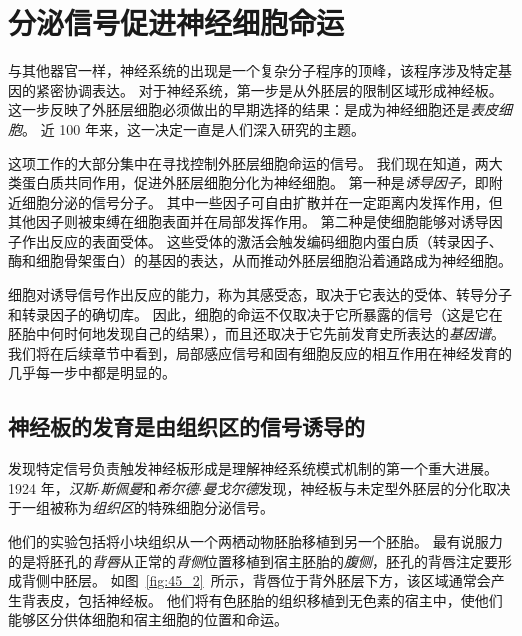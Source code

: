 \section{分泌信号促进神经细胞命运}

与其他器官一样，神经系统的出现是一个复杂分子程序的顶峰，该程序涉及特定基因的紧密协调表达。
对于神经系统，第一步是从外胚层的限制区域形成神经板。
这一步反映了外胚层细胞必须做出的早期选择的结果：是成为神经细胞还是\textit{表皮细胞}。
近 100 年来，这一决定一直是人们深入研究的主题。


这项工作的大部分集中在寻找控制外胚层细胞命运的信号。
我们现在知道，两大类蛋白质共同作用，促进外胚层细胞分化为神经细胞。
第一种是\textit{诱导因子}，即附近细胞分泌的信号分子。
其中一些因子可自由扩散并在一定距离内发挥作用，但其他因子则被束缚在细胞表面并在局部发挥作用。
第二种是使细胞能够对诱导因子作出反应的表面受体。
这些受体的激活会触发编码细胞内蛋白质（转录因子、酶和细胞骨架蛋白）的基因的表达，从而推动外胚层细胞沿着通路成为神经细胞。


细胞对诱导信号作出反应的能力，称为其感受态，取决于它表达的受体、转导分子和转录因子的确切库。
因此，细胞的命运不仅取决于它所暴露的信号（这是它在胚胎中何时何地发现自己的结果），而且还取决于它先前发育史所表达的\textit{基因谱}。
我们将在后续章节中看到，局部感应信号和固有细胞反应的相互作用在神经发育的几乎每一步中都是明显的。



\subsection{神经板的发育是由组织区的信号诱导的}

发现特定信号负责触发神经板形成是理解神经系统模式机制的第一个重大进展。
1924 年，\textit{汉斯$\cdot$斯佩曼}和\textit{希尔德$\cdot$曼戈尔德}发现，神经板与未定型外胚层的分化取决于一组被称为\textit{组织区}的特殊细胞分泌信号。


他们的实验包括将小块组织从一个两栖动物胚胎移植到另一个胚胎。
最有说服力的是将胚孔的\textit{背唇}从正常的\textit{背侧}位置移植到宿主胚胎的\textit{腹侧}，胚孔的背唇注定要形成背侧中胚层。
如图~\ref{fig:45_2}~所示，背唇位于背外胚层下方，该区域通常会产生背表皮，包括神经板。
他们将有色胚胎的组织移植到无色素的宿主中，使他们能够区分供体细胞和宿主细胞的位置和命运。


